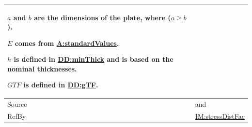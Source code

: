 \documentclass[12pt]{article}
\begin{document}
\begin{minipage}{\textwidth}
\begin{tabular}{>{\raggedright}p{}>{\raggedright\arraybackslash}p{}}
        $a$ and $b$ are the dimensions of the plate, where ($a\geq{}b$).
        
        $E$ comes from \hyperref[assumpSV]{A:standardValues}.
        
        $h$ is defined in \hyperref[DD:minThick]{DD:minThick} and is based on the nominal thicknesses.
        
        $\mathit{GTF}$ is defined in \hyperref[DD:gTF]{DD:gTF}.
        
\\ \midrule
Source & \cite{astm2009} and \cite[(Eq. 7)]{campidelli}
         
\\ \midrule
RefBy & \hyperref[IM:stressDistFac]{IM:stressDistFac}
        
\\ \bottomrule
\end{tabular}
\end{minipage}
\end{document}
